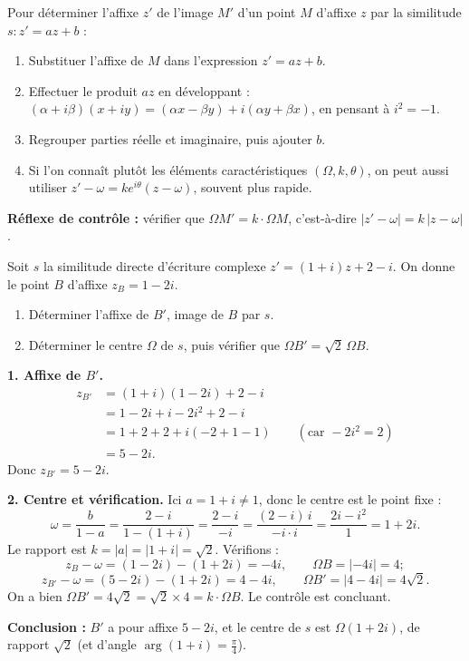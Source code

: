 \documentclass[11pt]{article}
\begin{document}
\begin{methode}
Pour déterminer l'affixe $z'$ de l'image $M'$ d'un point $M$ d'affixe $z$ par la similitude $s : z' = az + b$ :
\begin{enumerate}
\item Substituer l'affixe de $M$ dans l'expression $z' = az + b$.
\item Effectuer le produit $az$ en développant : $(\alpha + i\beta)(x + iy) = (\alpha x - \beta y) + i(\alpha y + \beta x)$, en pensant à $i^2 = -1$.
\item Regrouper parties réelle et imaginaire, puis ajouter $b$.
\item Si l'on connaît plutôt les éléments caractéristiques $(\Omega, k, \theta)$, on peut aussi utiliser $z' - \omega = ke^{i\theta}(z - \omega)$, souvent plus rapide.
\end{enumerate}
\textbf{Réflexe de contrôle :} vérifier que $\Omega M' = k \cdot \Omega M$, c'est-à-dire $|z' - \omega| = k\,|z - \omega|$.
\end{methode}

\begin{exoresolu}
Soit $s$ la similitude directe d'écriture complexe $z' = (1 + i)z + 2 - i$. On donne le point $B$ d'affixe $z_B = 1 - 2i$.
\begin{enumerate}
\item Déterminer l'affixe de $B'$, image de $B$ par $s$.
\item Déterminer le centre $\Omega$ de $s$, puis vérifier que $\Omega B' = \sqrt{2}\,\Omega B$.
\end{enumerate}
\tcblower
\textbf{1. Affixe de $B'$.}
\begin{align*}
z_{B'} &= (1+i)(1 - 2i) + 2 - i \\
&= 1 - 2i + i - 2i^2 + 2 - i \\
&= 1 + 2 + 2 + i(-2 + 1 - 1) \qquad (\text{car } -2i^2 = 2)\\
&= 5 - 2i.
\end{align*}
Donc $z_{B'} = 5 - 2i$.

\textbf{2. Centre et vérification.} Ici $a = 1+i \neq 1$, donc le centre est le point fixe :
\[ \omega = \frac{b}{1-a} = \frac{2 - i}{1 - (1+i)} = \frac{2 - i}{-i} = \frac{(2-i)\,i}{-i \cdot i} = \frac{2i - i^2}{1} = 1 + 2i. \]
Le rapport est $k = |a| = |1+i| = \sqrt{2}$. Vérifions :
\[ z_B - \omega = (1 - 2i) - (1 + 2i) = -4i, \qquad \Omega B = |{-4i}| = 4 ; \]
\[ z_{B'} - \omega = (5 - 2i) - (1 + 2i) = 4 - 4i, \qquad \Omega B' = |4 - 4i| = 4\sqrt{2}. \]
On a bien $\Omega B' = 4\sqrt{2} = \sqrt{2} \times 4 = k \cdot \Omega B$. Le contrôle est concluant.

\textbf{Conclusion :} $B'$ a pour affixe $5 - 2i$, et le centre de $s$ est $\Omega(1 + 2i)$, de rapport $\sqrt{2}$ (et d'angle $\arg(1+i) = \frac{\pi}{4}$).
\end{exoresolu}
\end{document}
